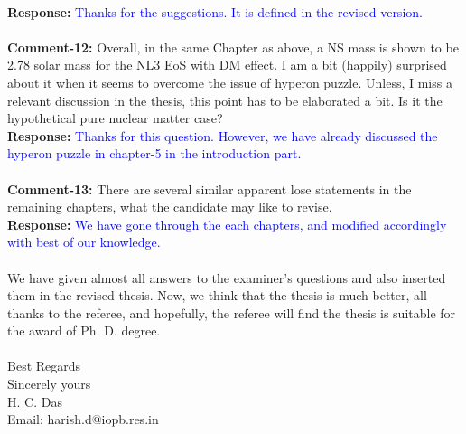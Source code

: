 \documentclass[aps,preprint,showpacs,amsmath,amssymb,prc,floatfix,nofootinbib]{revtex4-1}
\begin{document}
\\
{\bf Response:} \textcolor{blue}{Thanks for the suggestions. It is defined in the revised version.}
\\
\\
{\bf Comment-12:} Overall, in the same Chapter as above, a NS mass is shown to be 2.78 solar mass for the NL3 EoS with DM effect. I am a bit (happily) surprised about it when it seems to overcome the issue of hyperon puzzle. Unless, I miss a relevant discussion in the thesis, this point has to be elaborated a bit. Is it the hypothetical pure nuclear matter case?
\\
{\bf Response:} \textcolor{blue}{Thanks for this question. However, we have already discussed the hyperon puzzle in chapter-5 in the introduction part.}
\\
\\
{\bf Comment-13:} There are several similar apparent lose statements in the remaining chapters, what the candidate may like to revise.
\\
{\bf Response:} \textcolor{blue}{We have gone through the each chapters, and modified accordingly with best of our knowledge.}
\\
\\
We have given almost all answers to the examiner's questions and also inserted them in the revised thesis. Now, we think that the thesis is much better, all thanks to the referee, and hopefully, the referee will find the thesis is suitable for the award of Ph. D. degree.
\\
\\
Best Regards
\\
Sincerely yours
\\
H. C. Das
\\
Email: harish.d@iopb.res.in
\end{document}
